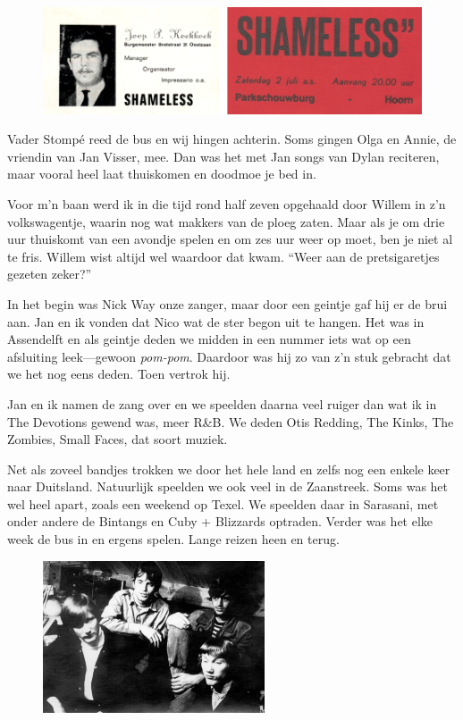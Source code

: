 \documentclass[12pt,twoside, openright]{memoir}
\begin{document}
\begin{figure}
\includegraphics[width=\textwidth]{img/ch30/shameless2}
\end{figure}

Vader Stompé reed de bus en wij hingen achterin. Soms gingen Olga en Annie, de vriendin van Jan Visser, mee. Dan was het met Jan songs van Dylan reciteren, maar vooral heel laat thuiskomen en doodmoe je bed in.

Voor m'n baan werd ik in die tijd rond half zeven opgehaald door Willem in z’n volkswagentje, waarin nog wat makkers van de ploeg zaten. Maar als je om drie uur thuiskomt van een avondje spelen en om zes uur weer op moet, ben je niet al te fris. Willem wist altijd wel waardoor dat kwam. ``Weer aan de pretsigaretjes gezeten zeker?''

In het begin was Nick Way onze zanger, maar door een geintje gaf hij er de brui aan. Jan en ik  vonden dat Nico wat de ster begon uit te hangen. Het was in Assendelft en als geintje deden we midden in een nummer iets wat op een afsluiting leek---gewoon \emph{pom-pom}. Daardoor was hij zo van z’n stuk gebracht dat we het nog eens deden. Toen vertrok hij.

Jan en ik namen de zang over en we speelden daarna veel ruiger dan wat ik in The Devotions gewend was, meer R&B. We deden Otis Redding, The Kinks, The Zombies, Small Faces, dat soort muziek.

Net als zoveel bandjes trokken we door het hele land en zelfs nog een enkele keer naar Duitsland. Natuurlijk speelden we ook veel in de Zaanstreek. Soms was het wel heel apart, zoals een weekend op Texel. We speelden daar in Sarasani, met onder andere de Bintangs en Cuby + Blizzards optraden. Verder was het elke week de bus in en ergens spelen. Lange reizen heen en terug.

\begin{figure}
\includegraphics[width=\textwidth]{img/ch30/optournee2a}
\end{figure}
\end{document}
